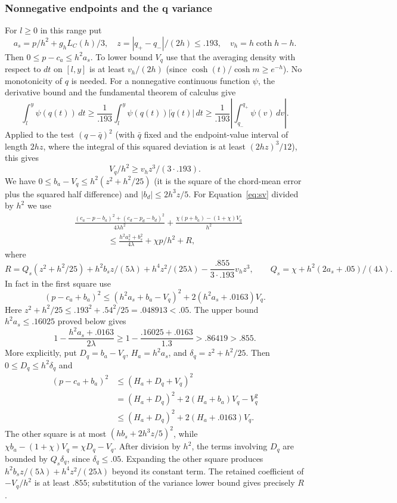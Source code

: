 \subsubsection{Nonnegative endpoints and the q variance}
For $l\ge0$ in this range put
\[
 a_s=p/h^2+g_h L_C(h)/3,\quad z=|q_+-q_-|/(2h)\le .193,\quad v_h=h\coth h-h.
\]
Then \(0\le p-c_a\le h^2 a_s\). To lower bound \(V_q\) use that the averaging density with respect to \(dt\) on \([l,y]\) is at least \(v_h/(2h)\) (since \(\cosh(t)/\cosh m\ge e^{-h}\)). No monotonicity of $q$ is needed. For a nonnegative continuous function
$\psi$, the derivative bound and the fundamental theorem of calculus give
\[
 \int_l^y\psi(q(t))\,dt
 \ge\frac1{.193}\int_l^y\psi(q(t))|\dot q(t)|\,dt
 \ge\frac1{.193}\left|\int_{q_-}^{q_+}\psi(v)\,dv\right|.
\]
Applied to the test \((q-\bar q)^2\) (with \(\bar q\) fixed and the endpoint-value interval of length \(2hz\), where the integral of this squared deviation is at least \((2hz)^3/12\)), this gives
\[
 V_q/h^2\ge v_h z^3/(3\cdot .193).
\]
We have \(0\le b_a-V_q\le h^2(z^2+h^2/25)\) (it is the square of the chord-mean error plus the squared half difference) and \(|b_d|\le2h^3 z/5\). For Equation~\eqref{eq:sv} divided by \(h^2\) we use
\[
 \begin{aligned}
 &\frac{(c_a-p-b_a)^2+(c_d-p_d-b_d)^2}{4\lambda h^2}
       +\frac{\chi(p+b_a)-(1+\chi)V_q}{h^2}\\
 &\qquad\qquad\le \frac{h^2 a_s^2+b_s^2}{4\lambda}+\chi p/h^2+R ,
 \end{aligned}
\]
where
\[
 R= Q_s(z^2+h^2/25)+h^2 b_s z/(5\lambda)+h^4 z^2/(25\lambda)
       -\frac{.855}{3\cdot .193}v_h z^3 ,
 \qquad Q_s=\chi+h^2(2a_s+.05)/(4\lambda).
\]
In fact in the first square use
\[
 (p-c_a+b_a)^2\le(h^2a_s+b_a-V_q)^2+2(h^2a_s+.0163)V_q .
\]
Here $z^2+h^2/25\le.193^2+.54^2/25=.048913<.05$.
The upper bound $h^2a_s\le.16025$ proved below gives
\[
 1-\frac{h^2a_s+.0163}{2\lambda}
 \ge 1-\frac{.16025+.0163}{1.3}>.86419>.855.
\]
More explicitly, put $D_q=b_a-V_q$, $H_a=h^2a_s$, and
$\delta_q=z^2+h^2/25$. Then $0\le D_q\le h^2\delta_q$ and
\[
\begin{aligned}
 (p-c_a+b_a)^2
 &\le(H_a+D_q+V_q)^2\\
 &=(H_a+D_q)^2+2(H_a+b_a)V_q-V_q^2\\
 &\le(H_a+D_q)^2+2(H_a+.0163)V_q.
\end{aligned}
\]
The other square is at most $(hb_s+2h^3z/5)^2$, while
$\chi b_a-(1+\chi)V_q=\chi D_q-V_q$.
After division by $h^2$, the terms involving $D_q$ are bounded by
$Q_s\delta_q$, since $\delta_q\le.05$. Expanding the other square
produces $h^2b_sz/(5\lambda)+h^4z^2/(25\lambda)$ beyond its constant
term. The retained coefficient of $-V_q/h^2$ is at least $.855$;
substitution of the variance lower bound gives precisely $R$.

